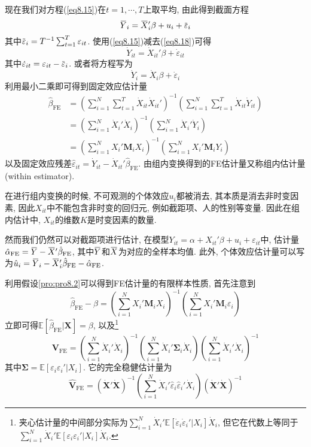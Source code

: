 \documentclass[cn, 12pt, math=mtpro2, bibstyle=apa, blue, twocol]{elegantbook}
\newcommand{\E}{\mathbb{E}}
\newcommand{\X}{\mathbold{X}}
\newcommand{\hb}{\hat{\beta}}
\newcommand{\V}{\mathbold{V}}
\newcommand{\overbar}[1]{\mkern 1.5mu\overline{\mkern-1.5mu#1\mkern-1.5mu}\mkern 1.5mu}
\begin{document}
现在我们对方程(\ref{eq8.15})在$t=1,\cdots,T$上取平均, 由此得到截面方程
\begin{equation}\label{eq8.18}
  \overbar{Y}_i=\overbar{X}_i'\beta+u_i+\overbar{\varepsilon}_i
\end{equation}
其中$\overbar{\varepsilon}_i=T^{-1}\sum_{t=1}^{T}\varepsilon_{it}$. 使用(\ref{eq8.15})减去(\ref{eq8.18})可得
$$\dot{Y}_{it}=\dot{X}_{it}'\beta+\dot{\varepsilon}_{it}$$
其中$\dot{\varepsilon}_{it}=\varepsilon_{it}-\overbar{\varepsilon}_i$. 或者将方程写为
$$\dot{Y}_i=\dot{X}_i\beta+\dot{\varepsilon}_i$$
利用最小二乘即可得到固定效应估计量
\begin{align*}
\hb_{\text{FE}}&=\left(\sum_{i=1}^{N}\sum_{t=1}^{T}\dot{X}_{it}\dot{X}_{it}'\right)^{-1}\left(\sum_{i=1}^{N}\sum_{t=1}^{T}\dot{X}_{it}\dot{Y}_{it}\right) \\
&=\left(\sum_{i=1}^{N}\dot{X}_i'\dot{X}_i\right)^{-1}\left(\sum_{i=1}^{N}\dot{X}_i'\dot{Y}_i\right) \\
&=\left(\sum_{i=1}^{N}X_i'\mathbold{M}_iX_i\right)^{-1}\left(\sum_{i=1}^{N}X_i'\mathbold{M}_iY_i\right)
\end{align*}
以及固定效应残差$\hat{\varepsilon}_{it}=\dot{Y}_{it}-\dot{X}_{it}'\hb_{\text{FE}}$. 由组内变换得到的FE估计量又称组内估计量 (within estimator).

\begin{remark}
在进行组内变换的时候, 不可观测的个体效应$u_i$都被消去, 其本质是消去非时变因素, 因此$X_{it}$中不能包含非时变的回归元, 例如截距项、人的性别等变量. 因此在组内估计中, $X_{it}$的维数$K$是时变因素的数量.

然而我们仍然可以对截距项进行估计, 在模型$Y_{it}=\alpha+X_{it}'\beta+u_i+\varepsilon_{it}$中, 估计量$\hat{\alpha}_{\text{FE}}=\overbar{Y}-\overbar{X}'\hb_{\text{FE}}$, 其中$\overbar{Y}$和$\overbar{X}$为对应的全样本均值. 此外, 个体效应估计量可以写为$\hat{u}_i=\overbar{Y}_i-\overbar{X}_i'\hb_{\text{FE}}-\hat{\alpha}_{\text{FE}}$.
\end{remark}

利用假设\ref{pro:pro8.2}可以得到FE估计量的有限样本性质, 首先注意到
$$\hb_{\text{FE}}-\beta=\left(\sum_{i=1}^{N}X_i'\mathbold{M}_iX_i\right)^{-1}\left(\sum_{i=1}^{N}X_i'\mathbold{M}_i\varepsilon_i\right)$$
立即可得$\E[\hb_{\text{FE}}|\X]=\beta$, 以及\footnote{夹心估计量的中间部分实际为$\sum_{i=1}^{N}\dot{X}_i'\E[\dot{\varepsilon}_i\dot{\varepsilon}_i'|X_i]\dot{X}_i$, 但它在代数上等同于$\sum_{i=1}^{N}\dot{X}_i'\E[\varepsilon_i\varepsilon_i'|X_i]\dot{X}_i$.}
\begin{equation}\label{eq8.19}
  \V_{\text{FE}}=\left(\sum_{i=1}^{N}\dot{X}_i'\dot{X}_i\right)^{-1}\left(\sum_{i=1}^{N}\dot{X}_i'\mathbold{\Sigma}_i\dot{X}_i\right)\left(\sum_{i=1}^{N}\dot{X}_i'\dot{X}_i\right)^{-1}
\end{equation}
其中$\mathbold{\Sigma}=\E[\varepsilon_i\varepsilon_i'|X_i]$. 它的完全稳健估计量为
\begin{equation}\label{eq8.34}
  \hat{\V}_{\text{FE}}=(\dot{\X}'\dot{\X})^{-1}\left(\sum_{i=1}^{N}\dot{X}_i'\hat{\varepsilon}_i\hat{\varepsilon}_i'\dot{X}_i\right)\left(\dot{\X}'\dot{\X}\right)^{-1}
\end{equation}
\end{document}
